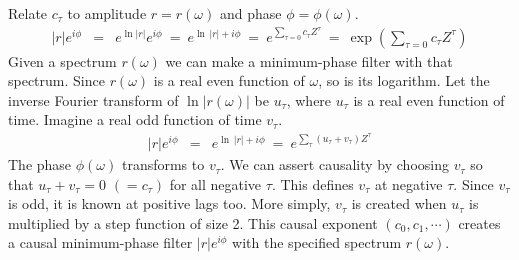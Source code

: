\par
Relate $c_\tau$ to amplitude $r=r(\omega)$ and phase $\phi=\phi(\omega)$.
\begin{eqnarray}
|r|e^{i\phi} &=&
e^{\ln|r|}e^{i\phi} \ =\
e^{\ln\,|r| + i\phi} \ =\  
e^{\sum_{\tau=0} c_\tau Z^\tau}
\ =\ \exp \left( \sum_{\tau=0} c_\tau Z^\tau\right)
\end{eqnarray}
Given a spectrum $r(\omega)$ we can make a minimum-phase filter with that spectrum.
Since $r(\omega)$ is a real even function of $\omega$, so is its logarithm.
Let the inverse Fourier transform of $\ln |r(\omega)|$ be $u_\tau$,
where $u_\tau$ is a real even function of time.
Imagine a real odd function of time $v_\tau$.
\begin{eqnarray}
|r|e^{i\phi} &=& e^{\ln\,|r| + i\phi} \ =\  e^{\sum_\tau (u_\tau+v_\tau) Z^\tau}
\end{eqnarray}
The phase $\phi(\omega)$ transforms to $v_\tau$.
We can assert causality
by choosing $v_\tau$ so that $u_\tau+v_\tau=0$ $ (=c_\tau)$ for all negative $\tau$.
This defines $v_\tau$ at negative $\tau$.
Since $v_\tau$ is odd, it is known at positive lags too.
More simply,
$v_\tau$ is created when $u_\tau$ is multiplied by a step function of size 2.  
This causal exponent
$(c_0,c_1,\cdots)$
creates a causal minimum-phase filter $|r|e^{i\phi}$
with the specified spectrum $r(\omega)$.

